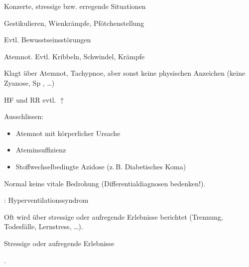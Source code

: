 \documentclass[
ngerman,
paper=a4,
asymmetric,
fontsize=10pt,
draft=false,
numbers=noenddot,
bibtotocnumbered,
footnotes=multiple,
]{scrreprt}
\newcommand{\jNEUende}{\newline{\color{green}\rule{\linewidth}{3pt}\newline}}
\begin{document}
{
\begin{ABCDESlide}
  \item[\ABCDE{1}] Konzerte, stressige bzw. erregende
  Situationen
  \item[\ABCDE{2}] Gestikulieren, Wienkrämpfe,
  Pfötchenstellung
  \item[\ABCDE{3}] Evtl. Bewusstseinsstörungen
  \item[\ABCDE{4}] Atemnot. Evtl. Kribbeln, Schwindel,
  Krämpfe
  \item[\ABCDE{B}] Klagt über Atemnot, Tachypnoe, aber sonst
  keine physischen Anzeichen (keine Zyanose, Sp
  \SymbolFindingNormal, \ldots)
  \item[\ABCDE{C}] HF und RR evtl. $\uparrow$
  \item[\ABCDE{E}] Ausschlissen:
  \begin{itemize}
    \item Atemnot mit körperlicher Ursache
    \item Ateminsuffizienz
    \item Stoffwechselbedingte Azidose (z.\,B. Diabetisches Koma)
  \end{itemize}
  \item[\ABCDE{=}] Normal keine vitale Bedrohung
  (Differentialdiagnosen bedenken!).
\end{ABCDESlide}
}
{}
{}
{}
 
{{\TxSAMPLER}: Hyperventilationssyndrom}
{
\begin{SAMPLERText}
  \item[\SAMPLER{E}] Oft wird über stressige oder aufregende
  Erlebnisse berichtet (Trennung, Todesfälle, Lernstress,
  \ldots).
\end{SAMPLERText}
}
{
\begin{SAMPLERSlide}
  \item[\SAMPLER{E}] Stressige oder aufregende
  Erlebnisse
\end{SAMPLERSlide}
}
{}
{}
{}
.
\jNEUende
\end{document}
